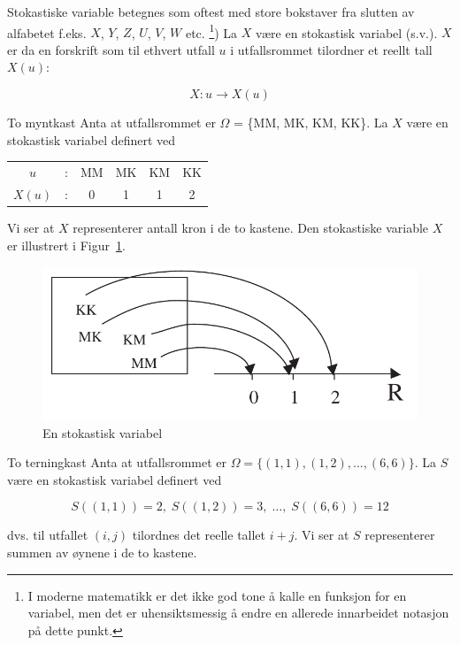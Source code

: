 \noindent Stokastiske variable betegnes som oftest med store bokstaver fra
slutten av alfabetet f.eks. $X$, $Y$, $Z$, $U$, $V$, $W$ etc. 
\footnote{I moderne matematikk er det ikke god tone å kalle en funksjon
for en variabel, men det er uhensiktsmessig å endre en allerede
innarbeidet notasjon på dette punkt.}) La $X$ være en stokastisk
variabel (s.v.). $X$ er da en forskrift som til ethvert utfall
$u$ i utfallsrommet tilordner et reellt tall $X(u)$:

\[         X : u \rightarrow X (u)\]

\begin{eksempel}{To myntkast}
Anta at utfallsrommet er $\Omega$ = \{MM, MK, KM, KK\}.
La $X$ være en stokastisk variabel definert ved
 \begin{center}
  \begin{tabular}{cccccc}
            $u$ & : & MM   & MK   & KM   & KK \\
          $X(u)$& : &   0  &  1   &   1  &  2
  \end{tabular}
\end{center}

\noindent Vi ser at $X$ representerer antall kron i de to kastene. Den
stokastiske variable $X$ er illustrert i Figur~\ref{fig:stokastisk_variabel}.
\end{eksempel}

\begin{figure}[ht]
\centering
\includegraphics[scale=0.8]{figurer/fig5_1.pdf} 
\caption{En stokastisk variabel}
	\label{fig:stokastisk_variabel}
\end{figure}

\begin{eksempel}{To terningkast}
Anta at utfallsrommet er $\Omega = \{(1,1), (1,2),...,(6,6)\}$.
La $S$ være en stokastisk variabel definert ved

\[   S((1,1))=2, \;  S((1,2))=3, \; \ldots, \; S((6,6))=12 \]

\noindent dvs. til utfallet $(i,j)$ tilordnes det reelle tallet $i+j$. Vi ser
at $S$ representerer summen av øynene i de to kastene.
\end{eksempel}

